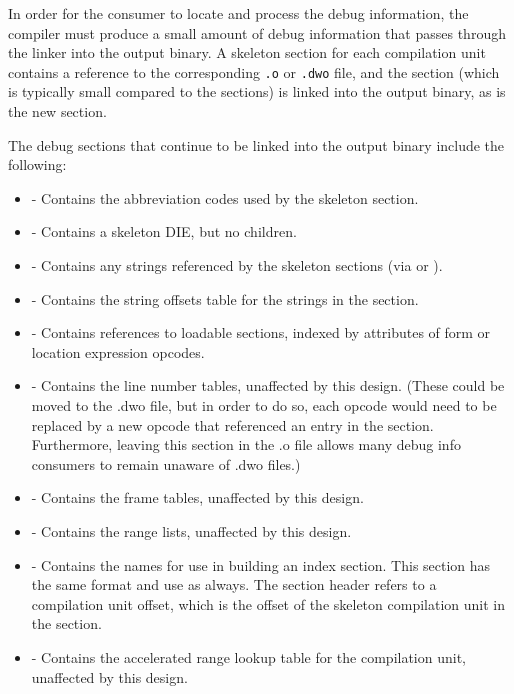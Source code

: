 In order for the consumer to locate and process the debug
information, the compiler must produce a small amount of debug
information that passes through the linker into the output
binary. A skeleton \dotdebuginfo{} section for each compilation unit
contains a reference to the corresponding \texttt{.o} or \texttt{.dwo}
file, and the \dotdebugline{} section (which is typically small
compared to the \dotdebuginfo{} sections) is
linked into the output binary, as is the new \dotdebugaddr{}
section.

The debug sections that continue to be linked into the
output binary include the following:
\begin{itemize}
\item
\dotdebugabbrev{} - Contains the abbreviation codes used by the
skeleton \dotdebuginfo{} section.
\item
\dotdebuginfo{} - Contains a skeleton \DWTAGcompileunit{} DIE,
but no children.
\item
\dotdebugstr{} - Contains any strings referenced by the skeleton
\dotdebuginfo{} sections (via \DWFORMstrp{} or \DWFORMstrx{}).
\item
\dotdebugstroffsets{} - Contains the string offsets table for
the strings in the \dotdebugstr{} section.
\item
\dotdebugaddr{} - Contains references to loadable sections,
indexed by attributes of form \DWFORMaddrx{} or location
expression \DWOPaddrx{} opcodes.
\item
\dotdebugline{} - Contains the line number tables, unaffected by
this design. (These could be moved to the .dwo file, but in
order to do so, each \DWLNEsetaddress{} opcode would need to
be replaced by a new opcode that referenced an entry in the
\dotdebugaddr{} section. Furthermore, leaving this section in the
.o file allows many debug info consumers to remain unaware of
.dwo files.)
\item
\dotdebugframe{} - Contains the frame tables, unaffected by this
design.
\item
\dotdebugranges{} - Contains the range lists, unaffected by this
design.
\item
\dotdebugnames{} - Contains the names for use in
building an index section. This section has the same
format and use as always. The section header refers to a
compilation unit offset, which is the offset of the
skeleton compilation unit in the \dotdebuginfo{} section.
\item
\dotdebugaranges{} - Contains the accelerated range lookup table
for the compilation unit, unaffected by this design.
\end{itemize}

